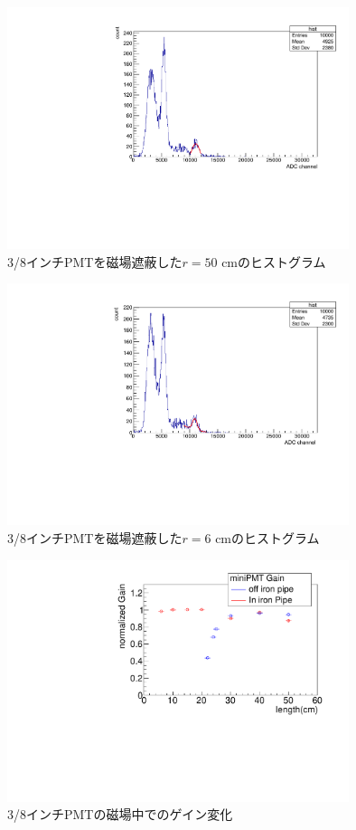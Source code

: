 \begin{figure}[tbp]
	\centering
		\includegraphics[angle=-90,width=10cm]{fig/iguchi/minicoin22.pdf}
	\caption{3/8インチPMTを磁場遮蔽した$r=50$ cmのヒストグラム}
	\label{histminicoin22}
\end{figure}

\begin{figure}[tbp]
	\centering
		\includegraphics[angle=-90,width=10cm]{fig/iguchi/minicoin21.pdf}
	\caption{3/8インチPMTを磁場遮蔽した$r=6$ cmのヒストグラム}
	\label{histminicoin21}
\end{figure}

\begin{figure}[tbp]
	\centering
		\includegraphics[angle=-90,width=10cm]{fig/iguchi/miniPMTgainG.pdf}
	\caption{3/8インチPMTの磁場中でのゲイン変化}
	\label{miniPMTgainG}
\end{figure}

